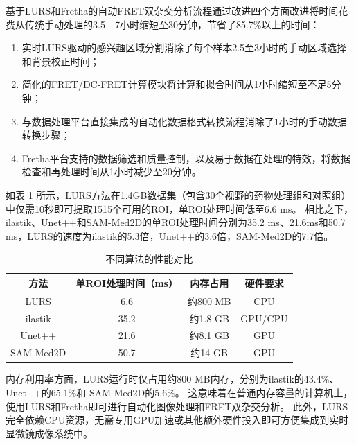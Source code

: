 基于LURS和Fretha的自动FRET双杂交分析流程通过改进四个方面改进将时间花费从传统手动处理的3.5 - 7小时缩短至30分钟，节省了85.7\%以上的时间：
\begin{enumerate}
  \item 实时LURS驱动的感兴趣区域分割消除了每个样本2.5至3小时的手动区域选择和背景校正时间；
  \item 简化的FRET/DC-FRET计算模块将计算和拟合时间从1小时缩短至不足5分钟；
  \item 与数据处理平台直接集成的自动化数据格式转换流程消除了1小时的手动数据转换步骤；
  \item Fretha平台支持的数据筛选和质量控制，以及易于数据在处理的特效，将数据检查和再处理时间从1小时减少至20分钟。
\end{enumerate}

如表 \ref{tab:性能对比} 所示，LURS方法在1.4GB数据集（包含30个视野的药物处理组和对照组）中仅需10秒即可提取1515个可用的ROI，单ROI处理时间低至6.6 ms。
相比之下，ilastik、Unet++和SAM-Med2D的单ROI处理时间分别为35.2 ms、21.6ms和50.7 ms，LURS的速度为ilastik的5.3倍，Unet++的3.6倍，SAM-Med2D的7.7倍。
\begin{table}[htbp]
  \centering
  \caption{不同算法的性能对比}
  \begin{tabular}{cccc}
  \toprule[1.5pt]
  方法 & 单ROI处理时间（ms） & 内存占用 & 硬件要求 \\
  \midrule
  LURS      & 6.6   & 约800 MB & CPU \\
  ilastik   & 35.2  & 约1.8 GB & GPU/CPU \\
  Unet++    & 21.6  & 约8.1 GB & GPU \\
  SAM-Med2D & 50.7  & 约14 GB & GPU \\
  \bottomrule[1.5pt]
  \end{tabular}
  \label{tab:性能对比}
\end{table}

内存利用率方面，LURS运行时仅占用约800 MB内存，分别为ilastik的43.4\%、Unet++的65.1\%和 SAM-Med2D的5.6\%。
这意味着在普通内存容量的计算机上，使用LURS和Fretha即可进行自动化图像处理和FRET双杂交分析。
此外，LURS完全依赖CPU资源，无需专用GPU加速或其他额外硬件投入即可方便集成到实时显微镜成像系统中。  

